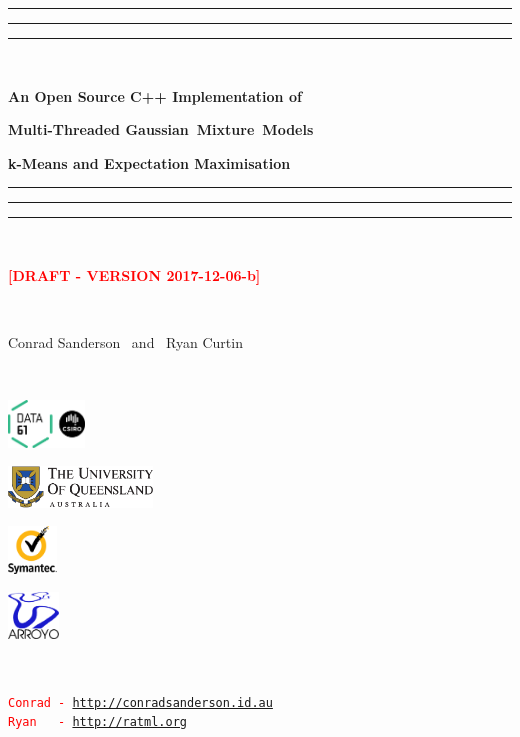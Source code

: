 \documentclass[usenames,dvipsnames]{beamer}
\begin{document}
\begin{frame}
\textcolor{ForestGreen}{\hrule}
\textcolor{ForestGreen}{\hrule}
\textcolor{ForestGreen}{\hrule}
\centerline{~}
\centerline{\Large\bf An Open Source C++ Implementation of}
\centerline{\Large\bf Multi-Threaded Gaussian~Mixture~Models}
\centerline{\Large\bf k-Means and Expectation Maximisation}
\vspace{-1ex}
\textcolor{ForestGreen}{\hrule}
\textcolor{ForestGreen}{\hrule}
\textcolor{ForestGreen}{\hrule}
\centerline{~}
\centerline{\textcolor{red}{\bf [DRAFT - VERSION 2017-12-06-b]}}
\centerline{~}
\centerline{\large Conrad Sanderson ~and~ Ryan Curtin}
\centerline{~}

\begin{center}
\begin{minipage}{1\textwidth}
\centering

\begin{minipage}{0.24\textwidth}
\centering
\includegraphics[height=1.25cm]{data61_logo_scaled_crop.png}
\end{minipage}
\begin{minipage}{0.35\textwidth}
\centering
\includegraphics[height=1.10cm]{UQ_logo.pdf}
\end{minipage}
\begin{minipage}{0.17\textwidth}
\centering
\includegraphics[height=1.25cm]{symantec_logo.pdf}
\end{minipage}
\begin{minipage}{0.17\textwidth}
\centering
\includegraphics[height=1.25cm]{arroyo_logo.png}
\end{minipage}

\end{minipage}
\end{center}

\centerline{~}


\begin{center}
\begin{minipage}{0.5\textwidth}
{\large\textcolor{red}{\small\texttt{Conrad~-~\href{http://conradsanderson.id.au}{http://conradsanderson.id.au}}}}\\
{\large\textcolor{red}{\small\texttt{Ryan~~~-~\href{http://ratml.org}{http://ratml.org}}}}
\end{minipage}
\end{center}

\end{frame}
\end{document}
